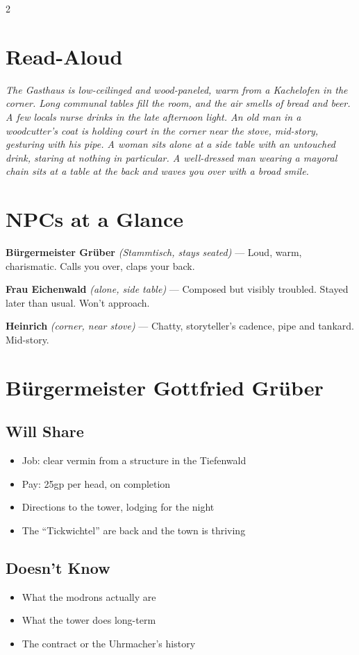 \documentclass[10pt,letterpaper]{article}
\newcommand{\npc}[3]{\textbf{#1} \textit{(#2)} --- #3}
\begin{document}
\begin{multicols}{2}

\section*{Read-Aloud}
\begin{readaloud}
\itshape
The Gasthaus is low-ceilinged and wood-paneled, warm from a Kachelofen in the corner. Long communal tables fill the room, and the air smells of bread and beer. A few locals nurse drinks in the late afternoon light. An old man in a woodcutter's coat is holding court in the corner near the stove, mid-story, gesturing with his pipe. A woman sits alone at a side table with an untouched drink, staring at nothing in particular. A well-dressed man wearing a mayoral chain sits at a table at the back and waves you over with a broad smile.
\end{readaloud}

\section*{NPCs at a Glance}

\npc{Bürgermeister Grüber}{Stammtisch, stays seated}{Loud, warm, charismatic. Calls you over, claps your back.}

\npc{Frau Eichenwald}{alone, side table}{Composed but visibly troubled. Stayed later than usual. Won't approach.}

\npc{Heinrich}{corner, near stove}{Chatty, storyteller's cadence, pipe and tankard. Mid-story.}

\section*{Bürgermeister Gottfried Grüber}
\subsection*{Will Share}
\begin{itemize}
\item Job: clear vermin from a structure in the Tiefenwald
\item Pay: 25gp per head, on completion
\item Directions to the tower, lodging for the night
\item The ``Tickwichtel'' are back and the town is thriving
\end{itemize}
\subsection*{Doesn't Know}
\begin{itemize}
\item What the modrons actually are
\item What the tower does long-term
\item The contract or the Uhrmacher's history
\end{itemize}

\end{multicols}
\end{document}
